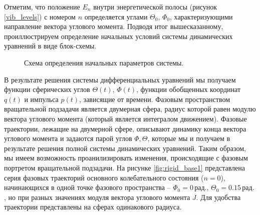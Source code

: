 Отметим, что положение $E_n$ внутри энергетической полосы (рисунок \eqref{vib_levels}) с номером $n$ определяется углами $\Theta_0$, $\Phi_0$, характеризующими направление вектора углового момента. Подводя итог вышесказанному, проиллюстрируем определение начальных условий системы динамических уравнений в виде блок-схемы.

\vverh
\begin{center}
  \begin{figure}[!ht]
    \caption{Схема определения начальных параметров системы.}
  \end{figure}
\end{center}

В результате решения системы дифференциальных уравнений мы получаем функции сферических углов $\Theta(t)$, $\Phi(t)$, функции обобщенных координат $q(t)$ и импульса $p(t)$, зависящие от времени. Фазовым пространством вращательной подзадачи является двумерная сфера, радиус которой равен модулю вектора углового момента (который является интегралом движением). Фазовые траектории, лежащие на двумерной сфере, описывают динамику конца вектора углового момента и задаются парой углов $\Phi, \Theta$, которые мы и получаем в результате решения полной системы динамических уравнений. Таким образом, мы имеем возможность проанилизировать изменения, происходящие с фазовым портретом вращательной подзадачи. На рисунке \eqref{fig:rigid_base1} представлена серия фазовых траекторий основного колебательного состояния ($n = 0$), начинающихся в одной точке фазового пространства  -- $\Phi_0 = 0 \, \text{рад.}$, $\Theta_0 = 0.15 \, \text{рад.}$ , но при разных значениях модуля вектора углового момента $J$. Для удобства траектории представлены на сферах одинакового радиуса.

